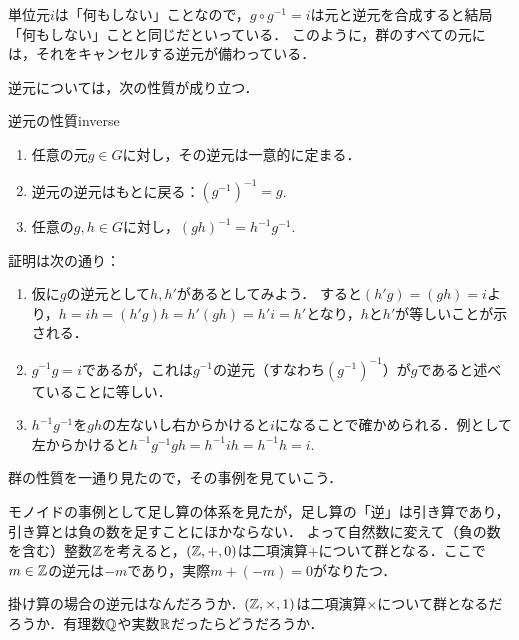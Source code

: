 \documentclass[11pt,a4paper, dvipdfmx]{jsarticle}
\begin{document}
単位元$i$は「何もしない」ことなので，$g \circ g^{-1} = i$は元と逆元を合成すると結局「何もしない」ことと同じだといっている．
このように，群のすべての元には，それをキャンセルする逆元が備わっている．

逆元については，次の性質が成り立つ．
\begin{prop}{逆元の性質}{inverse}    
\begin{enumerate}
    \item 任意の元$g \in G$に対し，その逆元は一意的に定まる．
    \item 逆元の逆元はもとに戻る：$(g^{-1})^{-1}=g$.
    \item 任意の$g,h \in G$に対し，$(gh)^{-1}=h^{-1}g^{-1}$.
\end{enumerate}
\end{prop}
証明は次の通り：
\begin{enumerate}
    \item 仮に$g$の逆元として$h, h'$があるとしてみよう．
    すると$(h'g)=(gh)=i$より，$h = ih = (h'g)h = h'(gh) = h'i = h'$となり，$h$と$h'$が等しいことが示される．
    \item $g^{-1}g=i$であるが，これは$g^{-1}$の逆元（すなわち$(g^{-1})^{-1}$）が$g$であると述べていることに等しい．
    \item $h^{-1}g^{-1}$を$gh$の左ないし右からかけると$i$になることで確かめられる．例として左からかけると$h^{-1}g^{-1}gh = h^{-1} i h = h^{-1}h = i$.
\end{enumerate}

群の性質を一通り見たので，その事例を見ていこう．

\begin{rei}{}{}
    モノイドの事例として足し算の体系を見たが，足し算の「逆」は引き算であり，引き算とは負の数を足すことにほかならない．
    よって自然数に変えて（負の数を含む）整数$\mathbb{Z}$を考えると，$(\mathbb{Z}, +, 0)$は二項演算$+$について群となる．ここで$m \in \mathbb{Z}$の逆元は$-m$であり，実際$m + (-m) = 0$がなりたつ．
\end{rei}

\begin{renshu}{}{}
    掛け算の場合の逆元はなんだろうか．$(\mathbb{Z}, \times, 1)$は二項演算$\times$について群となるだろうか．有理数$\mathbb{Q}$や実数$\mathbb{R}$だったらどうだろうか．
\end{renshu}
\end{document}
